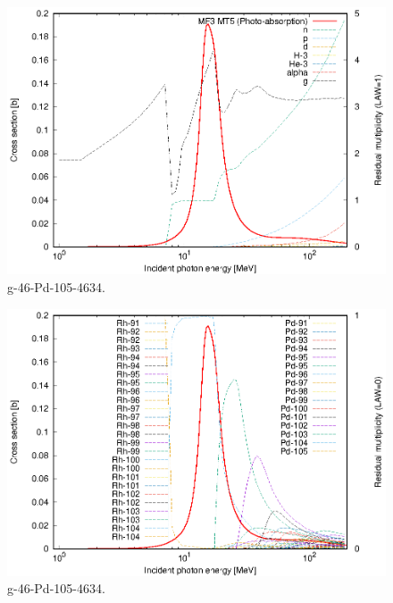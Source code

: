 \begin{figure}
 \includegraphics[width=\linewidth]{eps/g_46-Pd-105_4634.eps}
  \caption{g-46-Pd-105-4634.}
\end{figure}
\begin{figure}
 \includegraphics[width=\linewidth]{eps-law0/g_46-Pd-105_4634.eps}
 \caption{g-46-Pd-105-4634.}
\end{figure}
\newpage \clearpage

